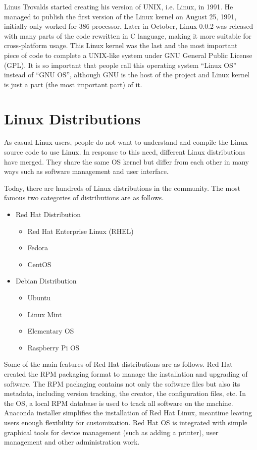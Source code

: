 Linus Trovalds started creating his version of UNIX, i.e. Linux, in 1991. He managed to publish the first version of the Linux kernel on August 25, 1991, initially only worked for 386 processor. Later in October, Linux 0.0.2 was released with many parts of the code rewritten in C language, making it more suitable for cross-platform usage. This Linux kernel was the last and the most important piece of code to complete a UNIX-like system under GNU General Public License (GPL). It is so important that people call this operating system ``Linux OS'' instead of ``GNU OS'', although GNU is the host of the project and Linux kernel is just a part (the most important part) of it.

\section{Linux Distributions}

As casual Linux users, people do not want to understand and compile the Linux source code to use Linux. In response to this need, different Linux distributions have merged. They share the same OS kernel but differ from each other in many ways such as software management and user interface.

Today, there are hundreds of Linux distributions in the community. The most famous two categories of distributions are as follows.
\begin{itemize}
  \item Red Hat Distribution
  \begin{itemize}
    \item Red Hat Enterprise Linux (RHEL)
    \item Fedora
    \item CentOS
  \end{itemize}
  \item Debian Distribution
  \begin{itemize}
    \item Ubuntu
    \item Linux Mint
    \item Elementary OS
    \item Raspberry Pi OS
  \end{itemize}
\end{itemize}

Some of the main features of Red Hat distributions are as follows. Red Hat created the RPM packaging format to manage the installation and upgrading of software. The RPM packaging contains not only the software files but also its metadata, including version tracking, the creator, the configuration files, etc. In the OS, a local RPM database is used to track all software on the machine. Anaconda installer simplifies the installation of Red Hat Linux, meantime leaving users enough flexibility for customization. Red Hat OS is integrated with simple graphical tools for device management (such as adding a printer), user management and other administration work.

